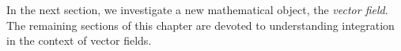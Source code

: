 In the next section, we investigate a new mathematical object, the \emph{vector field}. The remaining sections of this chapter are devoted to understanding integration in the context of vector fields.



